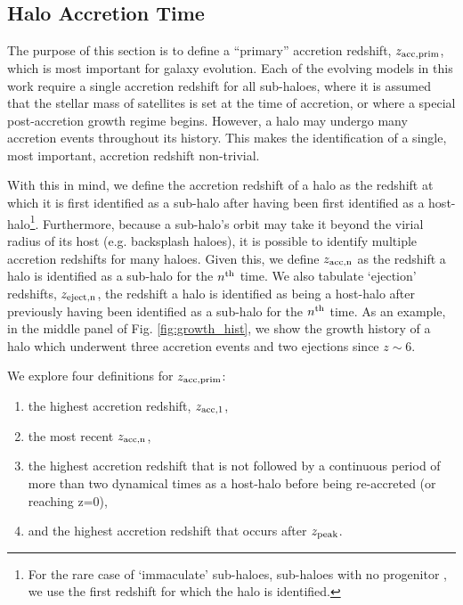 \documentclass[a4paper,fleqn,usenatbib]{mnras}
\begin{document}
\subsection{Halo Accretion Time}
\label{sec:halo_acc_time}

The purpose of this section is to define a ``primary'' accretion redshift, $z_{\rm acc, prim}$, which is most important for galaxy evolution.  Each of the evolving models in this work require a single accretion redshift for all sub-haloes, where it is assumed that the stellar mass of satellites is set at the time of accretion, or where a special post-accretion growth regime begins.  However, a halo may undergo many accretion events throughout its history.  This makes the identification of a single, most important, accretion redshift non-trivial.

With this in mind, we define the accretion redshift of a halo as the redshift at which it is first identified as a sub-halo after having been first identified as a host-halo\footnote{For the rare case of `immaculate' sub-haloes, sub-haloes with no progenitor \citep{vandenBosch:2016uv}, we use the first redshift for which the halo is identified.}.  Furthermore, because a sub-halo's orbit may take it beyond the virial radius of its host (e.g. backsplash haloes), it is possible to identify multiple accretion redshifts for many haloes.  Given this, we define $z_{\rm acc,n}$ as the redshift a halo is identified as a sub-halo for the $n^{\rm th}$ time.  We also tabulate `ejection' redshifts, $z_{\rm eject, n}$, the redshift a halo is identified as being a host-halo after previously having been identified as a sub-halo for the $n^{\rm th}$ time.  As an example, in the middle panel of Fig. \ref{fig:growth_hist}, we show the growth history of a halo which underwent three accretion events and two ejections since $z \sim 6$.

We explore four definitions for $z_{\rm acc, prim}$:
\begin{enumerate}
\item the highest accretion redshift, $z_{\rm acc,1}$, 
\item the most recent $z_{\rm acc, n}$, 
\item the highest accretion redshift that is not followed by a continuous period of more than two dynamical times as a host-halo before being re-accreted (or reaching z=0),
\item and the highest accretion redshift that occurs after $z_{\rm peak}$.  
\end{enumerate}
\end{document}
